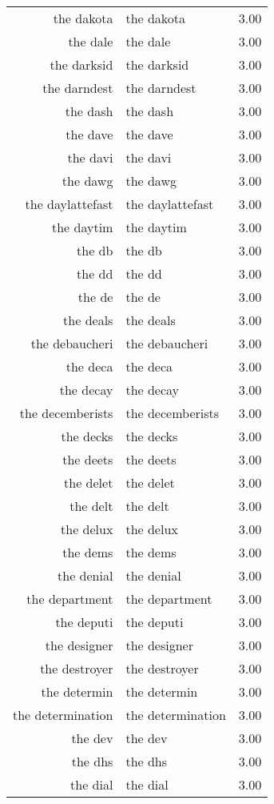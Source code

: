 \begin{table}[ht]
\begin{tabular}{rlr}
  the dakota & the dakota & 3.00 \\ 
  the dale & the dale & 3.00 \\ 
  the darksid & the darksid & 3.00 \\ 
  the darndest & the darndest & 3.00 \\ 
  the dash & the dash & 3.00 \\ 
  the dave & the dave & 3.00 \\ 
  the davi & the davi & 3.00 \\ 
  the dawg & the dawg & 3.00 \\ 
  the daylattefast & the daylattefast & 3.00 \\ 
  the daytim & the daytim & 3.00 \\ 
  the db & the db & 3.00 \\ 
  the dd & the dd & 3.00 \\ 
  the de & the de & 3.00 \\ 
  the deals & the deals & 3.00 \\ 
  the debaucheri & the debaucheri & 3.00 \\ 
  the deca & the deca & 3.00 \\ 
  the decay & the decay & 3.00 \\ 
  the decemberists & the decemberists & 3.00 \\ 
  the decks & the decks & 3.00 \\ 
  the deets & the deets & 3.00 \\ 
  the delet & the delet & 3.00 \\ 
  the delt & the delt & 3.00 \\ 
  the delux & the delux & 3.00 \\ 
  the dems & the dems & 3.00 \\ 
  the denial & the denial & 3.00 \\ 
  the department & the department & 3.00 \\ 
  the deputi & the deputi & 3.00 \\ 
  the designer & the designer & 3.00 \\ 
  the destroyer & the destroyer & 3.00 \\ 
  the determin & the determin & 3.00 \\ 
  the determination & the determination & 3.00 \\ 
  the dev & the dev & 3.00 \\ 
  the dhs & the dhs & 3.00 \\ 
  the dial & the dial & 3.00 \\ 

\end{tabular}
\end{table}
